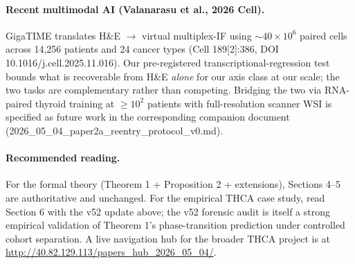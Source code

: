 \documentclass[letterpaper,11pt]{article}
\begin{document}
\paragraph{Recent multimodal AI (Valanarasu et al., 2026 Cell).}
GigaTIME translates H\&E $\to$ virtual multiplex-IF using
${\sim}40 \times 10^6$ paired cells across 14,256 patients and
24 cancer types (Cell 189[2]:386, DOI 10.1016/j.cell.2025.11.016).
Our pre-registered transcriptional-regression test bounds what
is recoverable from H\&E \emph{alone} for our axis class at our
scale; the two tasks are complementary rather than competing.
Bridging the two via RNA-paired thyroid training at
$\geq 10^2$ patients with full-resolution scanner WSI is
specified as future work in the corresponding companion document
(2026\_05\_04\_paper2a\_reentry\_protocol\_v0.md).

\paragraph{Recommended reading.} For the formal theory
(Theorem 1 + Proposition 2 + extensions), Sections 4--5 are
authoritative and unchanged. For the empirical THCA case study,
read Section 6 with the v52 update above; the v52 forensic
audit is itself a strong empirical validation of Theorem 1's
phase-transition prediction under controlled cohort separation.
A live navigation hub for the broader THCA project is at
\url{http://40.82.129.113/papers_hub_2026_05_04/}.
\end{document}
